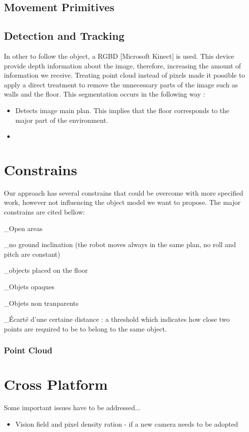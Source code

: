\subsection{Movement Primitives}

\subsection{Detection and Tracking}

In other to follow the object, a RGBD [Microsoft Kinect] is used. This device provide depth information about the image, therefore,
increasing the amount of information we receive. Treating point cloud instead of pixels made it possible to apply a direct 
treatment to remove the unnecessary parts of the image such as walls and the floor. This segmentation occurs in the following way :

\begin{itemize}
  \item Detects image main plan. This implies that the floor corresponds to the major part of the environment. 
  \item 
\end{itemize}


\section {Constrains} 
Our approach has several constrains that could be overcome with more specified work, however not influencing the object model we want
to propose. The major constrains are cited bellow: 

_Open areas

_no ground inclination (the robot moves always in the same plan, no roll and pitch are constant)

_objects placed on the floor

_Objets opaques

_Objets non tranparents

_Écarté d'une certaine distance : a threshold which indicates how close two points are required to be to belong to the same object.


\subsubsection{Point Cloud}



\section{Cross Platform}

Some important issues have to be addressed...

\begin{itemize}
  \item Vision field and pixel density ration - if a new camera needs to be adopted

\end{itemize}

